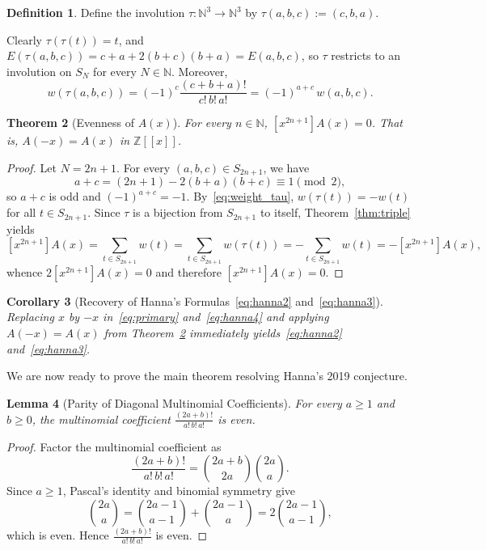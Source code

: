 \documentclass[11pt,a4paper]{article}
\newtheorem{theorem}{Theorem}[section]
\newtheorem{lemma}[theorem]{Lemma}
\newtheorem{corollary}[theorem]{Corollary}
\theoremstyle{definition}
\newtheorem{definition}[theorem]{Definition}
\theoremstyle{remark}
\newcommand{\N}{\mathbb{N}}
\newcommand{\Z}{\mathbb{Z}}
\newcommand{\coeff}[1]{[x^{#1}]}
\begin{document}
\begin{definition}\label{def:tau}
Define the involution $\tau : \N^3 \to \N^3$ by $\tau(a,b,c) := (c,b,a)$.
\end{definition}

Clearly $\tau(\tau(t)) = t$, and $E(\tau(a,b,c)) = c + a + 2(b+c)(b+a) = E(a,b,c)$, so $\tau$ restricts to an involution on $S_N$ for every $N \in \N$. Moreover,
\begin{equation}\label{eq:weight_tau}
w(\tau(a,b,c)) = (-1)^c \frac{(c+b+a)!}{c!\,b!\,a!} = (-1)^{a+c}\, w(a,b,c).
\end{equation}

\begin{theorem}[Evenness of $A(x)$]\label{thm:even}
For every $n \in \N$, $\coeff{2n+1} A(x) = 0$. That is, $A(-x) = A(x)$ in $\Z[[x]]$.
\end{theorem}

\begin{proof}
Let $N = 2n + 1$. For every $(a,b,c) \in S_{2n+1}$, we have
\[
a + c = (2n + 1) - 2(b+a)(b+c) \equiv 1 \pmod{2},
\]
so $a + c$ is odd and $(-1)^{a+c} = -1$. By~\eqref{eq:weight_tau}, $w(\tau(t)) = -w(t)$ for all $t \in S_{2n+1}$. Since $\tau$ is a bijection from $S_{2n+1}$ to itself, Theorem~\ref{thm:triple} yields
\[
\coeff{2n+1} A(x)
= \sum_{t \in S_{2n+1}} w(t)
= \sum_{t \in S_{2n+1}} w(\tau(t))
= -\sum_{t \in S_{2n+1}} w(t)
= -\coeff{2n+1} A(x),
\]
whence $2\coeff{2n+1} A(x) = 0$ and therefore $\coeff{2n+1} A(x) = 0$.
\end{proof}

\begin{corollary}[Recovery of Hanna's Formulas~\eqref{eq:hanna2} and~\eqref{eq:hanna3}]
Replacing $x$ by $-x$ in~\eqref{eq:primary} and~\eqref{eq:hanna4} and applying $A(-x) = A(x)$ from Theorem~\ref{thm:even} immediately yields~\eqref{eq:hanna2} and~\eqref{eq:hanna3}.
\end{corollary}

We are now ready to prove the main theorem resolving Hanna's 2019 conjecture.

\begin{lemma}[Parity of Diagonal Multinomial Coefficients]\label{lem:diag}
For every $a \ge 1$ and $b \ge 0$, the multinomial coefficient $\frac{(2a+b)!}{a!\,b!\,a!}$ is even.
\end{lemma}

\begin{proof}
Factor the multinomial coefficient as
\[
\frac{(2a+b)!}{a!\,b!\,a!}
= \binom{2a+b}{2a} \binom{2a}{a}.
\]
Since $a \ge 1$, Pascal's identity and binomial symmetry give
\[
\binom{2a}{a} = \binom{2a-1}{a-1} + \binom{2a-1}{a} = 2\binom{2a-1}{a-1},
\]
which is even. Hence $\frac{(2a+b)!}{a!\,b!\,a!}$ is even.
\end{proof}
\end{document}
